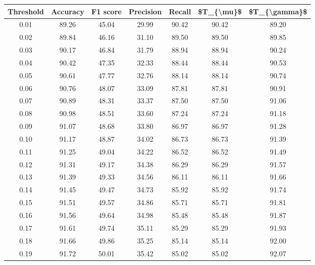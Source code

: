 \begin{tabular}{|c|c|c|c|c|c|c|}
\hline
 Threshold &  Accuracy &  F1 score &  Precision &  Recall &  \$T\_\{\textbackslash mu\}\$ &  \$T\_\{\textbackslash gamma\}\$ \\
\hline
      0.01 &     89.26 &     45.04 &      29.99 &   90.42 &      90.42 &         89.20 \\
      0.02 &     89.84 &     46.16 &      31.10 &   89.50 &      89.50 &         89.85 \\
      0.03 &     90.17 &     46.84 &      31.79 &   88.94 &      88.94 &         90.24 \\
      0.04 &     90.42 &     47.35 &      32.33 &   88.44 &      88.44 &         90.53 \\
      0.05 &     90.61 &     47.77 &      32.76 &   88.14 &      88.14 &         90.74 \\
      0.06 &     90.76 &     48.07 &      33.09 &   87.81 &      87.81 &         90.91 \\
      0.07 &     90.89 &     48.31 &      33.37 &   87.50 &      87.50 &         91.06 \\
      0.08 &     90.98 &     48.51 &      33.60 &   87.24 &      87.24 &         91.18 \\
      0.09 &     91.07 &     48.68 &      33.80 &   86.97 &      86.97 &         91.28 \\
      0.10 &     91.17 &     48.87 &      34.02 &   86.73 &      86.73 &         91.39 \\
      0.11 &     91.25 &     49.04 &      34.22 &   86.52 &      86.52 &         91.49 \\
      0.12 &     91.31 &     49.17 &      34.38 &   86.29 &      86.29 &         91.57 \\
      0.13 &     91.39 &     49.33 &      34.56 &   86.11 &      86.11 &         91.66 \\
      0.14 &     91.45 &     49.47 &      34.73 &   85.92 &      85.92 &         91.74 \\
      0.15 &     91.51 &     49.57 &      34.86 &   85.71 &      85.71 &         91.81 \\
      0.16 &     91.56 &     49.64 &      34.98 &   85.48 &      85.48 &         91.87 \\
      0.17 &     91.61 &     49.74 &      35.11 &   85.29 &      85.29 &         91.93 \\
      0.18 &     91.66 &     49.86 &      35.25 &   85.14 &      85.14 &         92.00 \\
      0.19 &     91.72 &     50.01 &      35.42 &   85.02 &      85.02 &         92.07 \\

\end{tabular}
